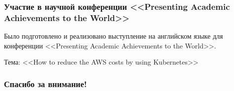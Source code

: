 \documentclass[10pt,utf8,presentation,compress]{beamer}
\begin{document}
\begin{frame}
\frametitle{Участие в научной конференции <<Presenting Academic Achievements to the World>>}
Было подготовлено и реализовано выступление на английском языке для конференции <<Presenting Academic Achievements to the World>>.


Тема: <<How to reduce the AWS costs by using Kubernetes>>
\end{frame}

\begin{frame}[c]
\begin{center}
\frametitle{\LARGE Спасибо за внимание!}

{\LARGE \inserttitle}

\bigskip\bigskip

{\large \insertauthor} 

\bigskip\bigskip

{\insertinstitute}

\bigskip\bigskip

{\large \insertdate}
\end{center}
\end{frame}
\end{document}
